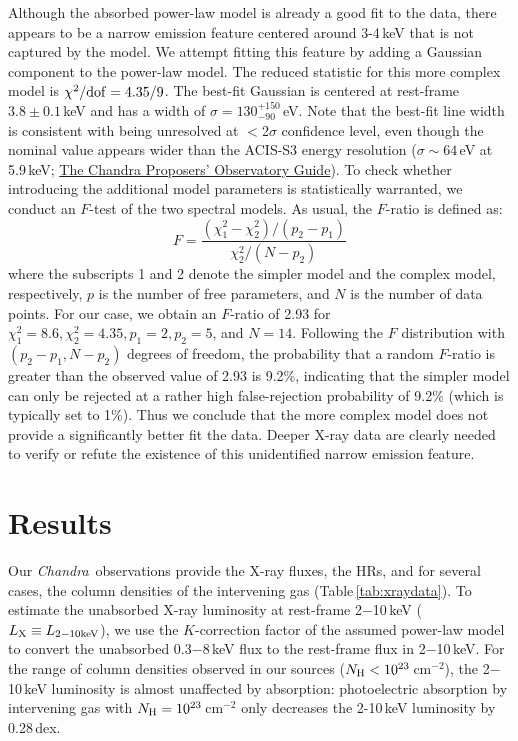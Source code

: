\documentclass[iop,revtex4,twocolumn,apj,numberedappendix,appendixfloats]{emulateapj}
\newcommand{\chandra}{{\it Chandra}}
\begin{document}
Although the absorbed power-law model is already a good fit to the data, there appears to be a narrow emission feature centered around 3-4\,keV that is not captured by the model. We attempt fitting this feature by adding a Gaussian component to the power-law model. The reduced statistic for this more complex model is $\chi^{2}/{\rm dof} = 4.35/9$. The best-fit Gaussian is centered at rest-frame $3.8\pm0.1$\,keV and has a width of $\sigma = 130^{+150}_{-90}$\,eV. Note that the best-fit line width is consistent with being unresolved at $<$2$\sigma$ confidence level, even though the nominal value appears wider than the ACIS-S3 energy resolution ($\sigma \sim 64$\,eV at 5.9\,keV; \href{http://cxc.harvard.edu/proposer/POG/html/chap6.html#tth_sEc6.7}{The Chandra Proposers' Observatory Guide}). 
To check whether introducing the additional model parameters is statistically warranted, we conduct an $F$-test of the two spectral models. As usual, the $F$-ratio is defined as:
\begin{equation}
F = \frac{(\chi^2_1-\chi^2_2)/(p_2-p_1)}{\chi^2_2/(N-p_2)}
\end{equation}
where the subscripts 1 and 2 denote the simpler model and the complex model, respectively, $p$ is the number of free parameters, and $N$ is the number of data points. For our case, we obtain an $F$-ratio of 2.93 for $\chi^2_1 = 8.6, \chi^2_2 = 4.35, p_1 = 2, p_2 = 5$, and $N = 14$. Following the $F$ distribution with $(p_2-p_1, N-p_2)$ degrees of freedom, the probability that a random $F$-ratio is greater than the observed value of 2.93 is 9.2\%, indicating that the simpler model can only be rejected at a rather high false-rejection probability of 9.2\% (which is typically set to 1\%). Thus we conclude that the more complex model does not provide a significantly better fit the data. Deeper X-ray data are clearly needed to verify or refute the existence of this unidentified narrow emission feature.

\section{Results} \label{sec:results}

Our \chandra\ observations provide the X-ray fluxes, the HRs, and for several cases, the column densities of the intervening gas (Table\,\ref{tab:xraydata}). To estimate the unabsorbed X-ray luminosity at rest-frame 2$-$10\,keV ($L_{\rm X} \equiv L_{\rm 2-10 keV}$), we use the $K$-correction factor of the assumed power-law model to convert the unabsorbed 0.3$-$8\,keV flux to the rest-frame flux in 2$-$10\,keV.
%
For the range of column densities observed in our sources ($N_{\rm H} < 10^{23}$\,cm$^{-2}$), the 2$-$10\,keV luminosity is almost unaffected by absorption: photoelectric absorption by intervening gas with $N_{\rm H} = 10^{23}$\,cm$^{-2}$ only decreases the 2-10\,keV luminosity by 0.28\,dex. 
\end{document}
